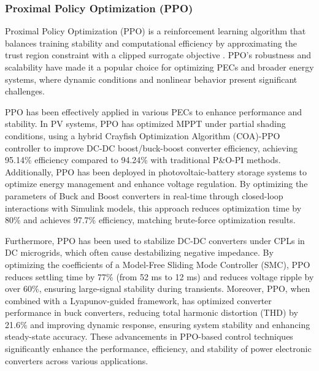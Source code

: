 \subsubsection{Proximal Policy Optimization (PPO)} 

Proximal Policy Optimization (PPO) is a reinforcement learning algorithm that balances training stability and computational efficiency by approximating the trust region constraint with a clipped surrogate objective \cite{schulman2017proximal}. PPO's robustness and scalability have made it a popular choice for optimizing PECs and broader energy systems, where dynamic conditions and nonlinear behavior present significant challenges.

PPO has been effectively applied in various PECs to enhance performance and stability. In PV systems, PPO has optimized MPPT under partial shading conditions, using a hybrid Crayfish Optimization Algorithm (COA)-PPO controller to improve DC-DC boost/buck-boost converter efficiency, achieving 95.14\% efficiency compared to 94.24\% with traditional P\&O-PI methods. Additionally, PPO has been deployed in photovoltaic-battery storage systems to optimize energy management and enhance voltage regulation. By optimizing the parameters of Buck and Boost converters in real-time through closed-loop interactions with Simulink models, this approach reduces optimization time by 80\% and achieves 97.7\% efficiency, matching brute-force optimization results.

Furthermore, PPO has been used to stabilize DC-DC converters under CPLs in DC microgrids, which often cause destabilizing negative impedance. By optimizing the coefficients of a Model-Free Sliding Mode Controller (SMC), PPO reduces settling time by 77\% (from 52 ms to 12 ms) and reduces voltage ripple by over 60\%, ensuring large-signal stability during transients. Moreover, PPO, when combined with a Lyapunov-guided framework, has optimized converter performance in buck converters, reducing total harmonic distortion (THD) by 21.6\% and improving dynamic response, ensuring system stability and enhancing steady-state accuracy. These advancements in PPO-based control techniques significantly enhance the performance, efficiency, and stability of power electronic converters across various applications.


